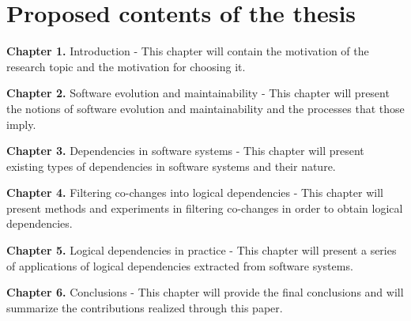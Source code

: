 \documentclass[12pt]{mitthesis}
\begin{document}
\section{Proposed contents of the thesis}

 	\textbf{Chapter 1.} Introduction - This chapter will contain the motivation of the research topic and the motivation for choosing it.

\textbf{Chapter 2.} Software evolution and maintainability - This chapter will present the notions of software evolution and maintainability and the processes that those imply.

\textbf{Chapter 3.} Dependencies in software systems - This chapter will present existing types of dependencies in software systems and their nature.

\textbf{Chapter 4.} Filtering co-changes into logical dependencies - This chapter will present methods and experiments in filtering co-changes in order to obtain logical dependencies.

\textbf{Chapter 5.} Logical dependencies in practice - This chapter will present a series of applications of logical dependencies extracted from software systems.

\textbf{Chapter 6.} Conclusions - This chapter will provide the final conclusions and will summarize the contributions realized through this paper.



\end{document}
